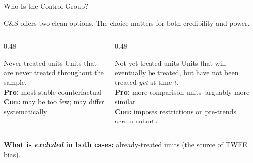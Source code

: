 \documentclass[main.tex]{subfiles}
\begin{document}
\begin{frame}{Who Is the Control Group?}

  C\&S offers two \alert{clean} options. The choice matters for both
  credibility and power.

  \bigskip
  \begin{columns}[T]
    \begin{column}{0.48\textwidth}
      \begin{block}{Never-treated units}
        Units that are never treated throughout the sample.\\[6pt]
        \textbf{Pro:} most stable counterfactual\\
        \textbf{Con:} may be too few; may differ systematically
      \end{block}
    \end{column}
    \begin{column}{0.48\textwidth}
      \begin{block}{Not-yet-treated units}
        Units that will eventually be treated, but have not been
        treated \emph{yet} at time $t$.\\[6pt]
        \textbf{Pro:} more comparison units; arguably more similar\\
        \textbf{Con:} imposes restrictions on pre-trends across
        cohorts
      \end{block}
    \end{column}
  \end{columns}

  \bigskip
  \textbf{What is \emph{excluded} in both cases:}
  already-treated units (the source of TWFE bias).

\end{frame}
\end{document}
